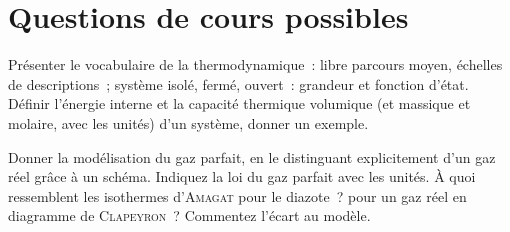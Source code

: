 \documentclass[a4paper, 10pt, final, garamond]{book}
\begin{document}
\section{Questions de cours possibles}
\begin{enumerate}[label=\sqenumi]

	\litem{23pt}{\str}%
	Présenter le vocabulaire de la thermodynamique~: libre parcours moyen,
	échelles de descriptions~; système isolé, fermé, ouvert~: grandeur et
	fonction d'état. Définir l'énergie interne et la capacité thermique
	volumique (et massique et molaire, avec les unités) d'un système, donner un
	exemple.

	\litem{23pt}{\str}%
	Donner la modélisation du gaz parfait, en le distinguant
	explicitement d'un gaz réel grâce à un schéma. Indiquez la loi du gaz
	parfait avec les unités. À quoi ressemblent les isothermes d'\textsc{Amagat}
	pour le diazote~? pour un gaz réel en diagramme de \textsc{Clapeyron}~?
	Commentez l'écart au modèle.


\end{enumerate}
\end{document}
